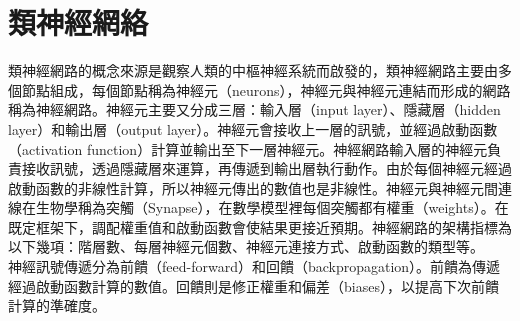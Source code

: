\documentclass[14pt,a4paper]{report}  %
\begin{document}
\section{類神經網絡}
 類神經網路的概念來源是觀察人類的中樞神經系統而啟發的，類神經網路主要由多個節點組成，每個節點稱為神經元（neurons），神經元與神經元連結而形成的網路稱為神經網路。神經元主要又分成三層：輸入層（input layer）、隱藏層（hidden layer）和輸出層（output layer）。神經元會接收上一層的訊號，並經過啟動函數（activation function）計算並輸出至下一層神經元。神經網路輸入層的神經元負責接收訊號，透過隱藏層來運算，再傳遞到輸出層執行動作。由於每個神經元經過啟動函數的非線性計算，所以神經元傳出的數值也是非線性。神經元與神經元間連線在生物學稱為突觸（Synapse），在數學模型裡每個突觸都有權重（weights）。在既定框架下，調配權重值和啟動函數會使結果更接近預期。神經網路的架構指標為以下幾項：階層數、每層神經元個數、神經元連接方式、啟動函數的類型等。\\
 神經訊號傳遞分為前饋（feed-forward）和回饋（backpropagation）。前饋為傳遞經過啟動函數計算的數值。回饋則是修正權重和偏差（biases），以提高下次前饋計算的準確度。
\end{document}
